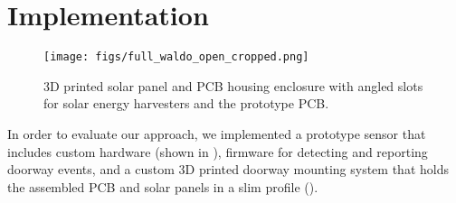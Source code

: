 \section{Implementation}
\label{sec:implementation}

\begin{figure}[t]
    \centering
    \texttt{[image: figs/full\_waldo\_open\_cropped.png]}
    \caption{3D printed solar panel and PCB housing enclosure with angled slots for solar energy harvesters and the \sysname prototype PCB.}
    \label{fig:mounting}
\end{figure}    


In order to evaluate our approach, we implemented a prototype \sysname sensor that includes custom hardware (shown in ), firmware for detecting and reporting doorway events, and a custom 3D printed doorway mounting system that holds the assembled PCB and solar panels in a slim profile ().

